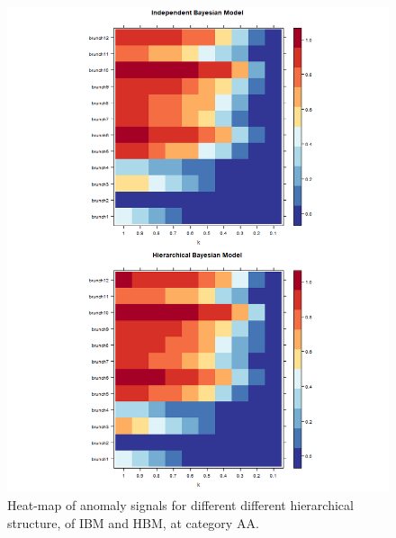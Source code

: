		\newpage
		
		\begin{figure}[!h]
			\centering
			\includegraphics[width=1\linewidth]{../../R-codes/JAGS/plots/sim2/heatAA}
			\caption{Heat-map of anomaly signals for different different hierarchical structure, of IBM and HBM, at category AA.}
			\label{fig:heatAA3}
		\end{figure}
		
		\newpage
		
